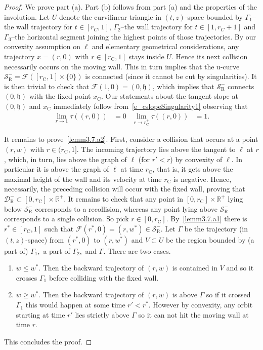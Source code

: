 \documentclass[10pt]{amsart}
\theoremstyle{definition}\newtheorem{defi}[theo]{Definition}\newtheorem{rema}[theo]{Remark}\newtheorem{exam}[theo]{Example}\newtheorem{exem}[theo]{Example}\newtheorem{nota}[theo]{Notation}
\newcommand{\ct}{r}
\newcommand{\fft}{\tau}
\newcommand{\crit}{\mathrm{C}}
\newcommand{\ctc}{\ct_\crit}
\newcommand{\xc}{x_\crit}
\newcommand{\reals}{\mathbb{R}}
\newcommand{\cF}{\mathcal{F}}
\newcommand{\cm}{\mathcal{F}}
\newcommand{\cell}{\mathcal{D}}
\newcommand{\slopeb}{\mathfrak{h}}
\newcommand{\recoPrivate}{\mathrm{R}}
\newcommand{\reco}{{\cell^-_{\recoPrivate}}}
\newcommand{\singPrivate}{\mathcal{S}}
\newcommand{\singReco}{\singPrivate_{\recoPrivate}}
\newcommand*{\relabel}{\renewcommand{\labelenumi}{(\theenumi)}}
\newcommand*{\romanenumi}{\renewcommand*{\theenumi}{\roman{enumi}}\relabel}
\begin{document}
\begin{proof}
We prove part (a). Part (b) follows from part (a) and the properties of the involution. Let $U$ denote the curvilinear triangle in $(t,z)$-space bounded by $\Gamma_1$--the wall trajectory for $t\in [r_C,1]$, $\Gamma_2$--the wall trajectory for $t\in [1, r_C+1]$ and $\Gamma_3$--the horizontal segment joining the highest points of those trajectories. By our convexity assumption on $\ell$ and elementary geometrical considerations, any trajectory $x = (r,0)$ with $r\in[\ctc,1]$ stays inside $U$. Hence its next collision necessarily occurs on the moving wall. This in turn implies that the u-curve $\singReco^- = \cm([\ctc,1]\times \{0\})$ is connected (since it cannot be cut by singularities). It is then trivial to check that $\cm(1,0)=(0,\slopeb)$, which implies that $\singReco^-$ connects $(0,\slopeb)$ with the fixed point $\xc$. Our statements about the tangent slope at $(0,\slopeb)$ and $\xc$ immediately follow from~\eqref{e_cslopeSingularity1} observing that
\begin{align*}
\lim_{\ct\to 1}\fft((\ct,0)) &= 0&
\lim_{\ct\to\ctc^+}\fft((\ct,0)) &= 1.
\end{align*}

It remains to prove~\eqref{lemm3.7.a2}. First, consider a collision that occurs at a point $(\ct,w)$ with $\ct \in (\ctc,1]$. The incoming trajectory lies above the tangent to $\ell$ at $\ct$, which, in turn, lies above the graph of $\ell$ (for $\ct' < \ct$) by convexity of $\ell$. In particular it is above the graph of $\ell$ at time $\ctc$, that is, it gets above the maximal height of the wall and its velocity at time $\ctc$ is negative. Hence, necessarily, the preceding collision will occur with the fixed wall, proving that $\reco\subset[0,\ctc]\times\reals^+$. It remains to check that any point in $[0,\ctc]\times\reals^+$ lying below $\singReco^-$ corresponds to a recollision, whereas any point lying above $\singReco^-$ corresponds to a single collision. So pick $r\in [0, \ctc]$. By~\eqref{lemm3.7.a1} there is $\ct^*\in [\ctc, 1]$ such that $\cF(\ct^*,0)=(r, w^*)\in \singReco^-$. Let $\Gamma$ be the trajectory (in $(t,z)$-space) from $(\ct^*,0)$ to $(r, w^*)$ and $V\subset U$ be the region bounded by (a part of) $\Gamma_1,$ a part of $\Gamma_2,$ and $\Gamma$. There are two cases.
\begin{enumerate}\romanenumi
\item $w\leq w^*$. Then the backward trajectory of $(r, w)$ is contained in $V$ and so it crosses $\Gamma_1$ before colliding with the fixed wall.
\item $w\geq w^*$. Then the backward trajectory of $(r, w)$ is above $\Gamma$ so if it crossed $\Gamma_1$ this would happen at some time $\ct'<\ct^*$. However by convexity, any orbit starting at time $\ct'$ lies strictly above $\Gamma$ so it can not hit the moving wall at time $r$.
\end{enumerate}
This concludes the proof.
\end{proof}
\end{document}
